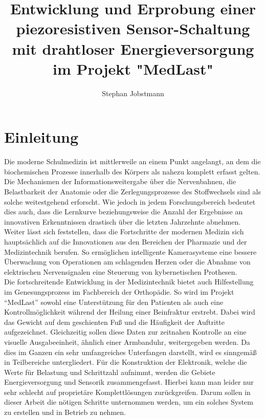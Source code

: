 \documentclass[12pt]{scrreprt} %
\title{Entwicklung und Erprobung einer piezoresistiven Sensor-Schaltung mit drahtloser Energieversorgung im Projekt "MedLast"}
\author{Stephan Jobstmann}
\date {}
\begin{document}
\maketitle
\setcounter {page}{1}
\tableofcontents
\listoffigures

\def\chapterpagestyle{fancy}

\chapter{Einleitung}
Die moderne Schulmedizin ist mittlerweile an einem Punkt angelangt, an dem die biochemischen Prozesse innerhalb des Körpers als nahezu komplett erfasst gelten. Die Mechanismen der Informationsweitergabe über die Nervenbahnen, die Belastbarkeit der Anatomie oder die Zerlegungsprozesse des Stoffwechsels sind als solche weitestgehend erforscht. Wie jedoch in jedem Forschungsbereich bedeutet dies auch, dass die Lernkurve beziehungsweise die Anzahl der Ergebnisse an innovativen Erkenntnissen drastisch über die letzten Jahrzehnte abnehmen. Weiter lässt sich feststellen, dass die Fortschritte der modernen Medizin sich hauptsächlich auf die Innovationen aus den Bereichen der Pharmazie und der Medizintechnik berufen. So ermöglichen intelligente Kamerasysteme eine bessere Überwachung von Operationen am schlagenden Herzen oder die Abnahme von elektrischen Nervensignalen eine Steuerung von kybernetischen Prothesen.\\
Die fortschreitende Entwicklung in der Medizintechnik bietet auch Hilfestellung im Genesungsprozess im Fachbereich der Orthopädie. So wird im Projekt "`MedLast"' sowohl eine Unterstützung für den Patienten als auch eine Kontrollmöglichkeit während der Heilung einer Beinfraktur erstrebt. Dabei wird das Gewicht auf dem geschienten Fuß und die Häufigkeit der Auftritte aufgezeichnet. Gleichzeitig sollen diese Daten zur zeitnahen Kontrolle an eine visuelle Ausgabeeinheit, ähnlich einer Armbanduhr, weitergegeben werden. Da dies im Ganzen ein sehr umfangreiches Unterfangen darstellt, wird es sinngemäß in Teilbereiche untergliedert. Für die Konstruktion der Elektronik, welche die Werte für Belastung und Schrittzahl aufnimmt, werden die Gebiete Energieversorgung und Sensorik zusammengefasst. Hierbei kann man leider nur sehr schlecht auf proprietäre Komplettlösungen zurückgreifen. Darum sollen in dieser Arbeit die nötigen Schritte unternommen werden, um ein solches System zu erstellen und in Betrieb zu nehmen.
\end{document}
